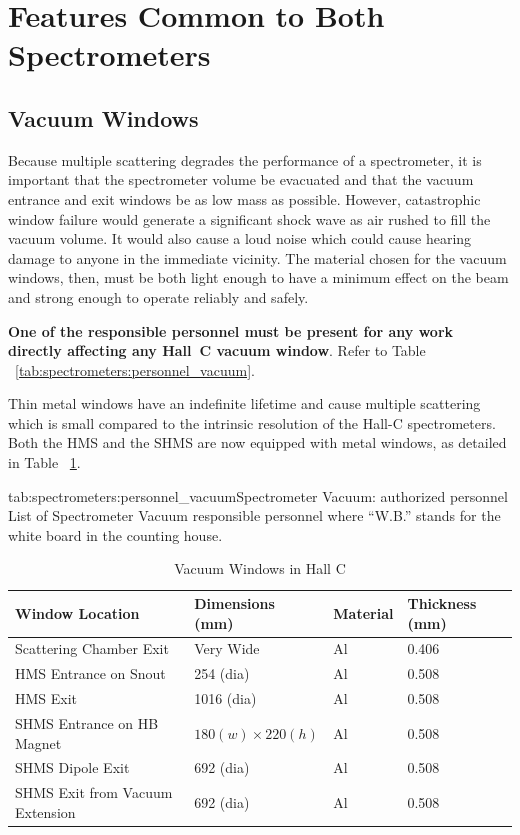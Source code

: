 \section{Features Common to Both Spectrometers}

\subsection{Vacuum Windows}

Because multiple scattering degrades the performance of a spectrometer, it is
important that the spectrometer volume be evacuated and that the vacuum
entrance and exit windows be as low mass as possible. However,
catastrophic window failure would generate a significant shock wave as air
rushed to fill the vacuum volume. It would also cause a loud noise which
could cause hearing damage to anyone in the immediate vicinity.
The material chosen for the vacuum windows, then, must be both light enough
to have a minimum effect on the beam and strong enough to operate reliably and safely.

{\bf One of the responsible personnel must be present for
any work directly affecting any Hall~C vacuum window}. Refer to Table ~\ref{tab:spectrometers:personnel_vacuum}.

Thin metal windows have an indefinite lifetime and cause
multiple scattering which is small compared to the intrinsic resolution of
the Hall-C spectrometers. Both the HMS and the SHMS are now equipped
with metal windows, as detailed in Table ~\ref{tab:hall_c_windows_specs}.

\begin{namestab}{tab:spectrometers:personnel_vacuum}{Spectrometer Vacuum: authorized personnel}{%
      List of Spectrometer Vacuum responsible personnel where ``W.B.'' stands for the white board
      in the counting house.}
   \JerryNines{}
\end{namestab}

\begin{table}
\begin{center}
\caption{Vacuum Windows in Hall C\label{tab:hall_c_windows_specs}}
\begin{tabular}{|l|l|l|l|}
\hline
Window Location				& Dimensions (mm) 	 	& Material & Thickness (mm) \\ \hline
Scattering Chamber Exit			& Very Wide		& Al		& 0.406\\
HMS Entrance	on Snout			& 254  (dia)		& Al		& 0.508\\
HMS Exit						& 1016  (dia)		& Al		& 0.508\\
SHMS Entrance on HB Magnet		& $180(w) \times 220(h)$	& Al	& 0.508\\
SHMS Dipole Exit				& 692 (dia)		& Al		& 0.508\\
SHMS Exit from Vacuum Extension	& 692 (dia)		& Al		& 0.508\\
\hline
\end{tabular}
\end{center}
\end{table}

